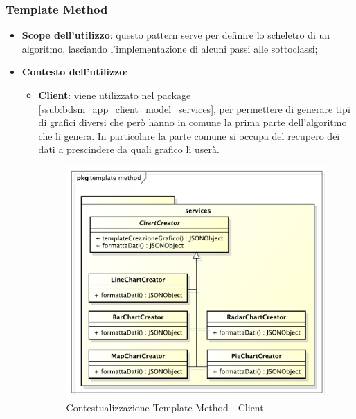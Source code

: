 	\subsubsection{Template Method} %
	\label{ssub:template_method}
		\begin{itemize}
			\item \textbf{Scope dell'utilizzo}: questo pattern serve per definire lo scheletro di un algoritmo, lasciando l'implementazione di alcuni passi alle sottoclassi;
			\item \textbf{Contesto dell'utilizzo}:
				\begin{itemize}
					\item \textbf{Client}: viene utilizzato nel package \ref{ssub:bdsm_app_client_model_services}, per permettere di generare tipi di grafici diversi che però hanno in comune la prima parte dell'algoritmo che li genera. In particolare la parte comune si occupa del recupero dei dati a prescindere da quali grafico li userà.
					\begin{figure}[!htbp]
						\centering
						\centerline{\includegraphics[scale=0.40]{./images/design_pattern_client/client_template_method.pdf}}
						\caption{Contestualizzazione Template Method - Client}
					\end{figure}


\end{itemize}
\end{itemize}
